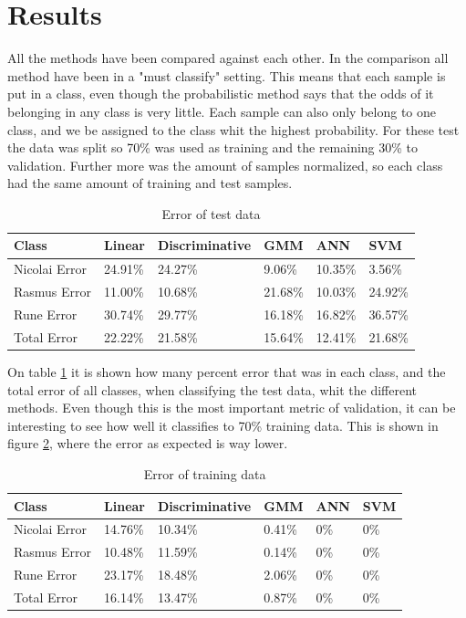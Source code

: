 \section{Results}

All the methods have been compared against each other. In the comparison all method have been in a "must classify" setting. This means that each sample is put in a class, even though the probabilistic method says that the odds of it belonging in any class is very little. Each sample can also only belong to one class, and we be assigned to the class whit the highest probability. For these test the data was split so 70\% was used as training and the remaining 30\% to validation. Further more was the amount of samples normalized, so each class had the same amount of training and test samples.


\begin{table}[H]
\centering
\begin{tabular}{llllll}
\hline
Class		&	Linear	&  Discriminative  & GMM  & ANN	& SVM \\ \hline
Nicolai Error &	24.91\%  & 24.27\%  &  9.06\%  & 10.35\%  &  3.56\% \\
Rasmus Error  &	11.00\%  & 10.68\%  & 21.68\%  & 10.03\%  & 24.92\% \\
Rune Error	  &	30.74\%  & 29.77\%  & 16.18\%  & 16.82\%  & 36.57\% \\ \hline
Total Error	  &	22.22\%  & 21.58\%  & 15.64\%  & 12.41\%  & 21.68\% \\ \hline
\end{tabular}
\caption{ Error of test data }
\label{tab:restest}
\end{table}

On table \ref{tab:restest} it is shown how many percent error that was in each class, and the total error of all classes, when classifying the test data, whit the different methods. Even though this is the most important metric of validation, it can be interesting to see how well it classifies to 70\% training data. This is shown in figure \ref{tab:restrain}, where the error as expected is way lower.

\begin{table}[H]
\centering
\begin{tabular}{llllll}
\hline
Class		&	Linear	&  Discriminative  & GMM  & ANN	& SVM \\ \hline
Nicolai Error &	14.76\%  & 10.34\%  &  0.41\%  & 0\%  &  0\% \\
Rasmus Error  &	10.48\%  & 11.59\%  & 0.14\%  & 0\%  & 0\% \\
Rune Error	  &	23.17\%  & 18.48\%  & 2.06\%  & 0\%  & 0\% \\ \hline
Total Error	  &	16.14\%  & 13.47\%  & 0.87\%  & 0\%  & 0\% \\ \hline
\end{tabular}
\caption{ Error of training data }
\label{tab:restrain}
\end{table}

